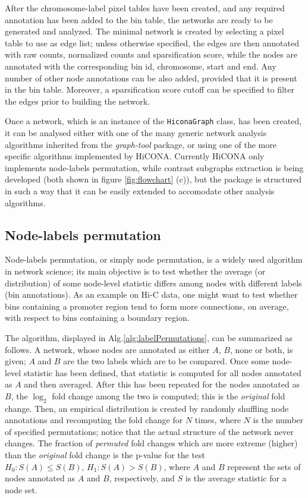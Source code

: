 After the chromosome-label pixel tables have been created, and any required annotation has been added to the bin table, the networks are ready to be generated and analyzed. The minimal network is created by selecting a pixel table to use as edge list; unless otherwise specified, the edges are then annotated with raw counts, normalized counts and sparsification score, while the nodes are annotated with the corresponding bin id, chromosome, start and end. Any number of other node annotations can be also added, provided that it is present in the bin table. Moreover, a sparsification score cutoff can be specified to filter the edges prior to building the network.

Once a network, which is an instance of the \texttt{HiconaGraph} class, has been created, it can be analysed either with one of the many generic network analysis algorithms inherited from the \emph{graph-tool} package, or using one of the more specific algorithms implemented by HiCONA. Currently HiCONA only implements node-labels permutation, while contrast subgraphs extraction is being developed (both shown in figure \ref{fig:flowchart} (c)), but the package is structured in such a way that it can be easily extended to accomodate other analysis algorithms.

\subsection{Node-labels permutation}

Node-labels permutation, or simply node permutation, is a widely used algorithm in network science; its main objective is to test whether the average (or distribution) of some node-level statistic differs among nodes with different labels (bin annotations). As an example on Hi-C data, one might want to test whether bins containing a promoter region tend to form more connections, on average, with respect to bins containing a boundary region. 

The algorithm, displayed in Alg.\ref{alg:labelPermutations}, can be summarized as follows. A network, whose nodes are annotated as either $A$, $B$, none or both, is given; $A$ and $B$ are the two labels which are to be compared. Once some node-level statistic has been defined, that statistic is computed for all nodes annotated as $A$ and then averaged. After this has been repeated for the nodes annotated as $B$, the $\log_2$ fold change among the two is computed; this is the \emph{original} fold change. Then, an empirical distribution is created by randomly shuffling node annotations and recomputing the fold change for $N$ times, where $N$ is the number of specified permutations; notice that the actual structure of the network never changes. The fraction of \emph{permuted} fold changes which are more extreme (higher) than the \emph{original} fold change is the p-value for the test $H_0: S(A) \leq S(B), \, H_1: S(A) > S(B)$, where $A$ and $B$ represent the sets of nodes annotated as $A$ and $B$, respectively, and $S$ is the average statistic for a node set. 

